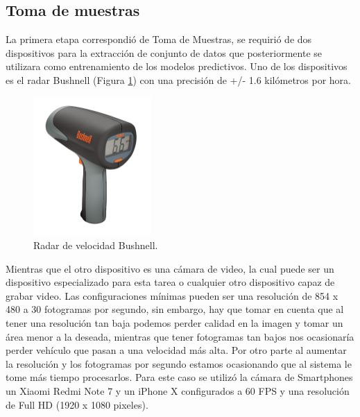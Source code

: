 
\subsection{Toma de muestras}

La primera etapa correspondió de Toma de Muestras, se requirió de dos dispositivos para la extracción de conjunto de datos que posteriormente se utilizara como entrenamiento de los modelos predictivos. Uno de los dispositivos es el radar Bushnell (Figura \ref{fig:RadarVelocidad}) con una precisión de +/- 1.6 kilómetros por hora.

\begin{figure}[H]
    \centering
    \includegraphics[width=0.4\textwidth]{Metodologia/imgs/bushnell.jpg}
    \caption{Radar de velocidad Bushnell.}
    \label{fig:RadarVelocidad}
\end{figure}

Mientras que el otro dispositivo es una cámara de video, la cual puede ser un dispositivo especializado para esta tarea o cualquier otro dispositivo capaz de grabar video. Las configuraciones mínimas pueden ser una resolución de 854 x 480 a 30 fotogramas por segundo, sin embargo, hay que tomar en cuenta que al tener una resolución tan baja podemos perder calidad en la imagen y tomar un área menor a la deseada, mientras que tener fotogramas tan bajos nos ocasionaría perder vehículo que pasan a una velocidad más alta. Por otro parte al aumentar la resolución y los fotogramas por segundo estamos ocasionando que al sistema le tome más tiempo procesarlos. Para este caso se utilizó la cámara de Smartphones un Xiaomi Redmi Note 7 y un iPhone X configurados a 60 FPS y una resolución de Full HD (1920 x 1080 pixeles).

